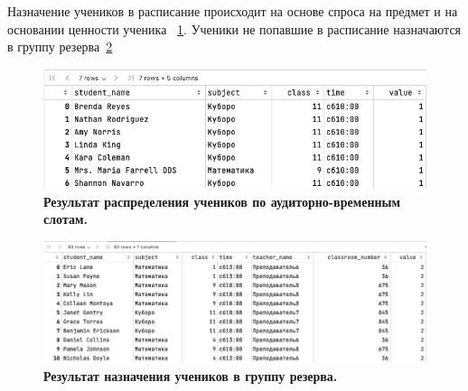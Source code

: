 Назначение учеников в расписание происходит на основе спроса на предмет и на основании ценности ученика ~\ref{dist_3}. Ученики не попавшие в расписание назначаются в группу резерва~\ref{dist_2}
\begin{figure}[!ht]
  \centering
  \includegraphics[width=\linewidth]{Images/dist_3.png}
  \caption{\textbf{Результат распределения учеников по аудиторно-временным слотам.}}
  \label{dist_3}
\end{figure}
\begin{figure}[!ht]
  \centering
  \includegraphics[width=\linewidth]{Images/dist_2.png}
  \caption{\textbf{Результат назначения учеников в группу резерва.}}
  \label{dist_2}
\end{figure}




